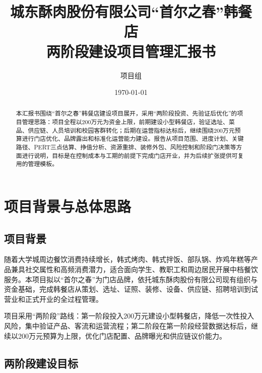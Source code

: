 \documentclass[UTF8,zihao=-4]{ctexart}
\title{\heiti 城东酥肉股份有限公司“首尔之春”韩餐店\\两阶段建设项目管理汇报书}
\author{项目组}
\date{\today}
\begin{document}
\maketitle

\begin{abstract}
本汇报书围绕“首尔之春”韩餐店建设项目展开，采用“两阶段投资、先验证后优化”的项目管理思路：项目全程以200万元为资金上限，前期建设小型韩餐店，验证选址、菜品、供应链、人员培训和校园客群转化；后期在运营指标达标后，继续围绕200万元预算进行门店优化、品牌露出和标准化运营能力建设。报告从项目范围、进度计划、关键路径、PERT三点估算、挣值分析、资源重排、装修外包、风险控制和阶段门决策等方面进行说明，目标是在控制成本与工期的前提下完成门店开业，并为后续扩张提供可复用的管理模板。
\end{abstract}

\tableofcontents
\newpage

\section{项目背景与总体思路}

\subsection{项目背景}

随着大学城周边餐饮消费持续增长，韩式烤肉、韩式拌饭、部队锅、炸鸡年糕等产品兼具社交属性和高频消费潜力，适合面向学生、教职工和周边居民开展中档餐饮服务。本项目拟以“首尔之春”为门店品牌，依托城东酥肉股份有限公司现有组织与资金基础，完成韩餐店从策划、选址、证照、装修、设备、供应链、招聘培训到试营业和正式开业的全过程管理。

项目采用“两阶段”路线：第一阶段投入200万元建设小型韩餐店，降低一次性投入风险，集中验证产品、客流和运营流程；第二阶段在第一阶段经营数据达标后，继续以200万元预算为上限，优化门店配置、品牌曝光和供应链议价能力。

\subsection{两阶段建设目标}
\end{document}
